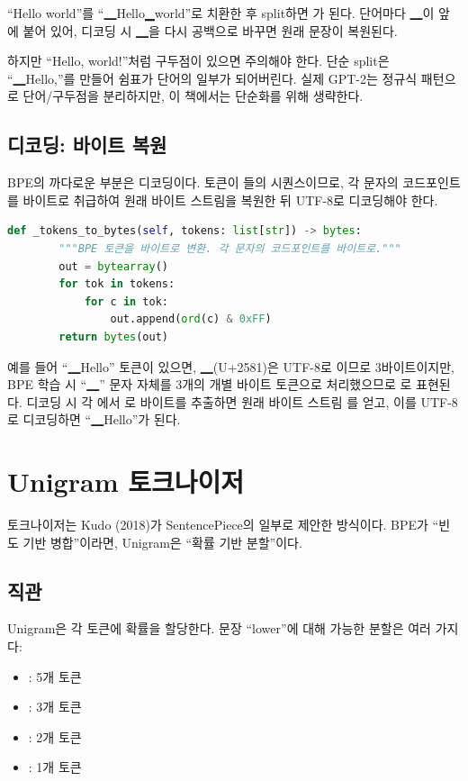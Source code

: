 \begin{warnbox}[공백 치환의 함정]
``Hello world''를 ``▁Hello▁world''로 치환한 후 split하면 가 된다. 단어마다 ▁이 앞에 붙어 있어, 디코딩 시 ▁을 다시 공백으로 바꾸면 원래 문장이 복원된다.

하지만 ``Hello, world!''처럼 구두점이 있으면 주의해야 한다. 단순 split은 ``▁Hello,''를 만들어 쉼표가 단어의 일부가 되어버린다. 실제 GPT-2는 정규식 패턴으로 단어/구두점을 분리하지만, 이 책에서는 단순화를 위해 생략한다.
\end{warnbox}

\subsection{디코딩: 바이트 복원}

BPE의 까다로운 부분은 디코딩이다. 토큰이 들의 시퀀스이므로, 각 문자의 코드포인트를 바이트로 취급하여 원래 바이트 스트림을 복원한 뒤 UTF-8로 디코딩해야 한다.

\begin{lstlisting}[language=Python]
    def _tokens_to_bytes(self, tokens: list[str]) -> bytes:
        """BPE 토큰을 바이트로 변환. 각 문자의 코드포인트를 바이트로."""
        out = bytearray()
        for tok in tokens:
            for c in tok:
                out.append(ord(c) & 0xFF)
        return bytes(out)
\end{lstlisting}

예를 들어 ``▁Hello'' 토큰이 있으면, ▁(U+2581)은 UTF-8로 이므로 3바이트이지만, BPE 학습 시 ``▁'' 문자 자체를 3개의 개별 바이트 토큰으로 처리했으므로 로 표현된다. 디코딩 시 각 에서 로 바이트를 추출하면 원래 바이트 스트림 를 얻고, 이를 UTF-8로 디코딩하면 ``▁Hello''가 된다.

\section{Unigram 토크나이저}

 토크나이저는 Kudo (2018)가 SentencePiece의 일부로 제안한 방식이다. BPE가 ``빈도 기반 병합''이라면, Unigram은 ``확률 기반 분할''이다.

\subsection{직관}

Unigram은 각 토큰에 확률을 할당한다. 문장 ``lower''에 대해 가능한 분할은 여러 가지다:
\begin{itemize}
  \item \code{[l, o, w, e, r]}: 5개 토큰
  \item \code{[lo, w, er]}: 3개 토큰
  \item \code{[low, er]}: 2개 토큰
  \item \code{[lower]}: 1개 토큰
\end{itemize}


